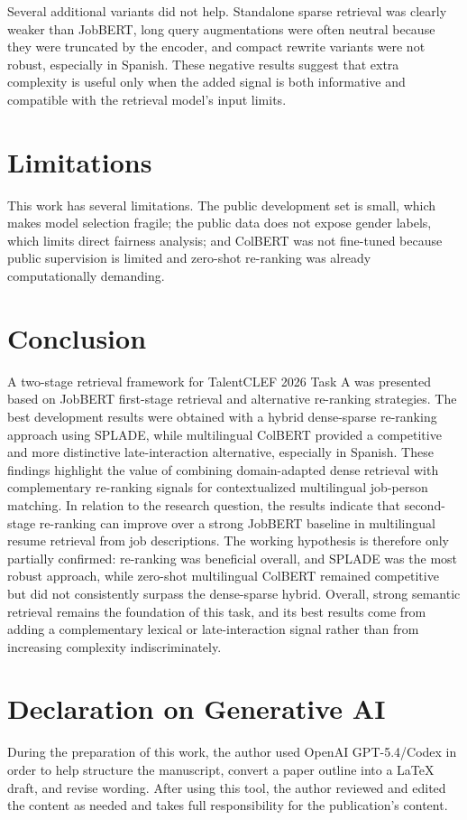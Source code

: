 \documentclass[
]{ceurart}
\begin{document}
Several additional variants did not help. Standalone sparse retrieval was clearly
weaker than JobBERT, long query augmentations were often neutral because they were
truncated by the encoder, and compact rewrite variants were not robust, especially in
Spanish. These negative results suggest that extra complexity is useful only when the
added signal is both informative and compatible with the retrieval model's input limits.

\section{Limitations}

This work has several limitations. The public development set is small, which makes
model selection fragile; the public data does not expose gender labels, which limits
direct fairness analysis; and ColBERT was not fine-tuned because public supervision
is limited and zero-shot re-ranking was already computationally demanding.

\section{Conclusion}

A two-stage retrieval framework for TalentCLEF 2026 Task A was presented based on
JobBERT first-stage retrieval and alternative re-ranking strategies. The best
development results were obtained with a hybrid dense-sparse re-ranking approach using
SPLADE, while multilingual ColBERT provided a competitive and more distinctive
late-interaction alternative, especially in Spanish. These findings highlight the
value of combining domain-adapted dense retrieval with complementary re-ranking signals
for contextualized multilingual job-person matching. In relation to the research
question, the results indicate that second-stage re-ranking can improve over a strong
JobBERT baseline in multilingual resume retrieval from job descriptions. The working
hypothesis is therefore only partially confirmed: re-ranking was beneficial overall,
and SPLADE was the most robust approach, while zero-shot multilingual ColBERT remained
competitive but did not consistently surpass the dense-sparse hybrid. Overall, strong
semantic retrieval remains the foundation of this task, and its best results come from
adding a complementary lexical or late-interaction signal rather than from increasing
complexity indiscriminately.

\section*{Declaration on Generative AI}
During the preparation of this work, the author used OpenAI GPT-5.4/Codex in
order to help structure the manuscript, convert a paper outline into a LaTeX draft,
and revise wording. After using this tool, the author reviewed and edited the
content as needed and takes full responsibility for the publication's content.


\end{document}
